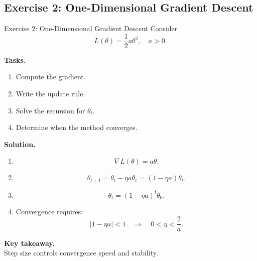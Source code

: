 \documentclass[aspectratio=169,11pt]{beamer}
\begin{document}
\subsection{Exercise 2: One-Dimensional Gradient Descent}
\begin{frame}[t,allowframebreaks]{Exercise 2: One-Dimensional Gradient Descent}
\small
Consider
\[
L(\theta) = \frac{1}{2} a \theta^2, \quad a > 0.
\]

\textbf{Tasks.}\\ \begin{enumerate}
    \item Compute the gradient.
    \item Write the update rule.
    \item Solve the recursion for $\theta_t$.
    \item Determine when the method converges.
\end{enumerate}

\textbf{Solution.}\\ \begin{enumerate}
\item 
\[
\nabla L(\theta) = a\theta.
\]

\item 
\[
\theta_{t+1} = \theta_t - \eta a \theta_t = (1 - \eta a)\theta_t.
\]

\item 
\[
\theta_t = (1 - \eta a)^t \theta_0.
\]

\item Convergence requires:
\[
|1 - \eta a| < 1 \quad \Rightarrow \quad 0 < \eta < \frac{2}{a}.
\]
\end{enumerate}

\textbf{Key takeaway.}\\ Step size controls convergence speed and stability.
\end{frame}
\end{document}
